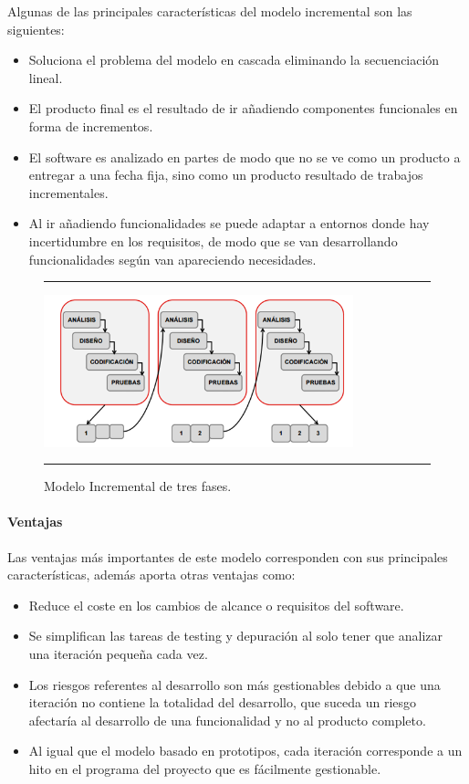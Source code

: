 Algunas de las principales características del modelo incremental son
las siguientes:
\begin{itemize}
\item Soluciona el problema del modelo en cascada eliminando la
  secuenciación lineal.
\item El producto final es el resultado de ir añadiendo componentes
  funcionales en forma de incrementos.
\item El software es analizado en partes de modo que no se ve como un
  producto a entregar a una fecha fija, sino como un producto
  resultado de trabajos incrementales.
\item Al ir añadiendo funcionalidades se puede adaptar a entornos
  donde hay incertidumbre en los requisitos, de modo que se van
  desarrollando funcionalidades según van apareciendo necesidades.
\end{itemize}

  

\begin{figure}[h]
\hrule\smallskip
\begin{center}
\includegraphics[width=0.8\textwidth]{fig/iterativo.png}
\end{center}
\caption{Modelo Incremental de tres fases.}
\label{fig:iterativo}
\hrule
\end{figure}

\paragraph{Ventajas} Las ventajas más importantes de este modelo corresponden con sus principales características, además aporta otras ventajas como:
\begin{itemize}
\item Reduce el coste en los cambios de alcance o requisitos del
  software.
\item Se simplifican las tareas de testing y depuración al solo tener
  que analizar una iteración pequeña cada vez.
\item Los riesgos referentes al desarrollo son más gestionables debido
  a que una iteración no contiene la totalidad del desarrollo, que
  suceda un riesgo afectaría al desarrollo de una funcionalidad y no
  al producto completo.
\item Al igual que el modelo basado en prototipos, cada iteración
  corresponde a un hito en el programa del proyecto que es fácilmente
  gestionable.
\end{itemize}


